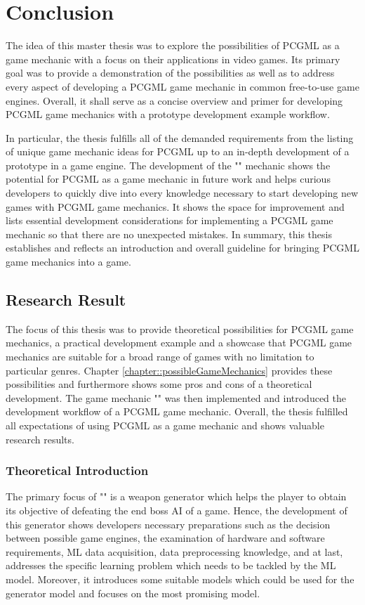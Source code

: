 \documentclass[MGS,Master,english]{twbook}%
\begin{document}
%
%
\clearpage
\chapter{Conclusion}
The idea of this master thesis was to explore the possibilities of \ac{PCGML} as a game mechanic with a focus on their applications in video games. Its primary goal was to provide a demonstration of the possibilities as well as to address every aspect of developing a \ac{PCGML} game mechanic in common free-to-use game engines. Overall, it shall serve as a concise overview and primer for developing \ac{PCGML} game mechanics with a prototype development example workflow.

In particular, the thesis fulfills all of the demanded requirements from the listing of unique game mechanic ideas for \ac{PCGML} up to an in-depth development of a prototype in a game engine. The development of the "" mechanic shows the potential for \ac{PCGML} as a game mechanic in future work and helps curious developers to quickly dive into every knowledge necessary to start developing new games with \ac{PCGML} game mechanics. It shows the space for improvement and lists essential development considerations for implementing a \ac{PCGML} game mechanic so that there are no unexpected mistakes. In summary, this thesis establishes and reflects an introduction and overall guideline for bringing \ac{PCGML} game mechanics into a game.

\section{Research Result}
The focus of this thesis was to provide theoretical possibilities for \ac{PCGML} game mechanics, a practical development example and a showcase that \ac{PCGML} game mechanics are suitable for a broad range of games with no limitation to particular genres. Chapter \ref{chapter::possibleGameMechanics} provides these possibilities and furthermore shows some pros and cons of a theoretical development. The game mechanic "" was then implemented and introduced the development workflow of a \ac{PCGML} game mechanic. Overall, the thesis fulfilled all expectations of using \ac{PCGML} as a game mechanic and shows valuable research results.

\subsection{Theoretical Introduction}
The primary focus of "" is a weapon generator which helps the player to obtain its objective of defeating the end boss \ac{AI} of a game. Hence, the development of this generator shows developers necessary preparations such as the decision between possible game engines, the examination of hardware and software requirements, \ac{ML} data acquisition, data preprocessing knowledge, and at last, addresses the specific learning problem which needs to be tackled by the \ac{ML} model. Moreover, it introduces some suitable models which could be used for the generator model and focuses on the most promising model.
\end{document}
